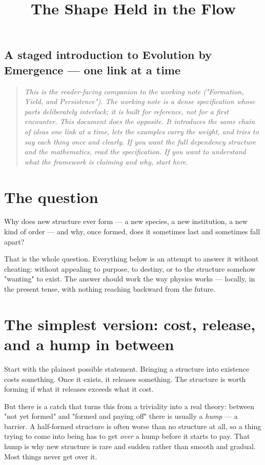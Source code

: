 \documentclass{article}
\title{The Shape Held in the Flow}
\author{}
\date{}
\begin{document}
\maketitle

\subsection*{A staged introduction to Evolution by Emergence --- one link at a time}

\begin{quote}
\textit{
This is the reader-facing companion to the working note ("Formation, Yield, and Persistence"). The working note is a dense specification whose parts deliberately interlock; it is built for reference, not for a first encounter. This document does the opposite. It introduces the same chain of ideas one link at a time, lets the examples carry the weight, and tries to say each thing once and clearly. If you want the full dependency structure and the mathematics, read the specification. If you want to understand what the framework is claiming and why, start here.
}
\end{quote}

\hr

\section{The question}

Why does new structure ever form --- a new species, a new institution, a new kind of order --- and why, once formed, does it sometimes last and sometimes fall apart?

That is the whole question. Everything below is an attempt to answer it without cheating: without appealing to purpose, to destiny, or to the structure somehow "wanting" to exist. The answer should work the way physics works --- locally, in the present tense, with nothing reaching backward from the future.

\section{The simplest version: cost, release, and a hump in between}

Start with the plainest possible statement. Bringing a structure into existence costs something. Once it exists, it releases something. The structure is worth forming if what it releases exceeds what it cost.

But there is a catch that turns this from a triviality into a real theory: between "not yet formed" and "formed and paying off" there is usually a \textit{hump} --- a barrier. A half-formed structure is often worse than no structure at all, so a thing trying to come into being has to get \textit{over} a hump before it starts to pay. That hump is why new structure is rare and sudden rather than smooth and gradual. Most things never get over it.
\end{document}
